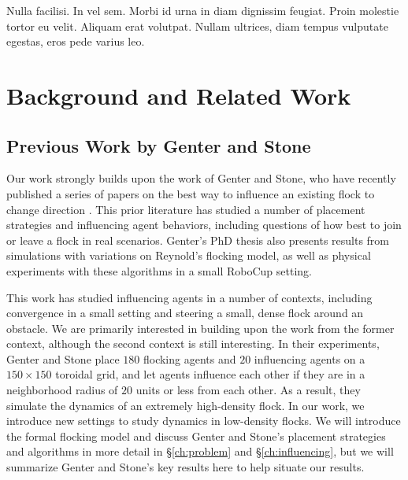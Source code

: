 \begin{savequote}[75mm]
Nulla facilisi. In vel sem. Morbi id urna in diam dignissim feugiat. Proin molestie tortor eu velit. Aliquam erat volutpat. Nullam ultrices, diam tempus vulputate egestas, eros pede varius leo.
\end{savequote}

\chapter{Background and Related Work}
\label{ch:background}

\section{Previous Work by Genter and Stone}
Our work strongly builds upon the work of Genter and Stone, who have recently
published a series of papers on the best way to influence an existing flock to
change direction \cite{genter2015placement, genter2014neighborsorientherd,
genter2013visionstationary, genter2013backsearch,
genter2016facegoalfacecurrent, genter201612steplookahead}.
This prior literature has studied a number of placement strategies and
influencing agent behaviors, including questions of how best to join or leave
a flock in real scenarios.
Genter's PhD thesis also presents results from simulations with variations on
Reynold's flocking model, as well as physical experiments with these algorithms
in a small RoboCup setting.

This work has studied influencing agents in a number of contexts, including
convergence in a small setting and steering a small, dense flock around an
obstacle.
We are primarily interested in building upon the work from the former context,
although the second context is still interesting.
In their experiments, Genter and Stone place $180$ flocking agents and $20$
influencing agents on a $150\times150$ toroidal grid, and let agents influence
each other if they are in a neighborhood radius of $20$ units or less from each
other.
As a result, they simulate the dynamics of an extremely high-density flock.
In our work, we introduce new settings to study dynamics in low-density flocks.
We will introduce the formal flocking model and discuss Genter and Stone's
placement strategies and algorithms in more detail in \S\ref{ch:problem} and
\S\ref{ch:influencing}, but we will summarize Genter and Stone's key results
here to help situate our results.

